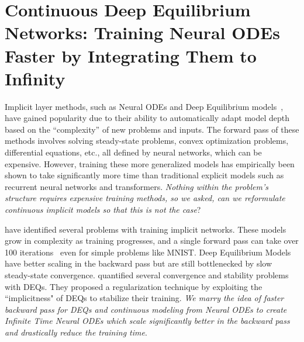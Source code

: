\chapter[Continuous Deep Equilibrium Networks]{Continuous Deep Equilibrium Networks: Training Neural ODEs Faster by Integrating Them to Infinity}
\label{chapter:infinite_time_neural_odes}

Implicit layer methods, such as Neural ODEs and Deep Equilibrium models~\citep{chen2018neural, bai_deep_2019, ghaoui_implicit_2020}, have gained popularity due to their ability to automatically adapt model depth based on the ``complexity'' of new problems and inputs. The forward pass of these methods involves solving steady-state problems, convex optimization problems, differential equations, etc., all defined by neural networks, which can be expensive. However, training these more generalized models has empirically been shown to take significantly more time than traditional explicit models such as recurrent neural networks and transformers. \textit{Nothing within the problem's structure requires expensive training methods, so we asked, can we reformulate continuous implicit models so that this is not the case}?

\citet{grathwohl2018ffjord, dupont2019augmented, kelly2020learning, finlay2020train} have identified several problems with training implicit networks. These models grow in complexity as training progresses, and a single forward pass can take over 100 iterations~\citep{kelly2020learning} even for simple problems like MNIST. Deep Equilibrium Models~\citep{bai_deep_2019, bai_multiscale_2020} have better scaling in the backward pass but are still bottlenecked by slow steady-state convergence. \citet{bai2021stabilizing} quantified several convergence and stability problems with DEQs. They proposed a regularization technique by exploiting the ``implicitness" of DEQs to stabilize their training. \textit{We marry the idea of faster backward pass for DEQs and continuous modeling from Neural ODEs to create Infinite Time Neural ODEs which scale significantly better in the backward pass and drastically reduce the training time}. %

